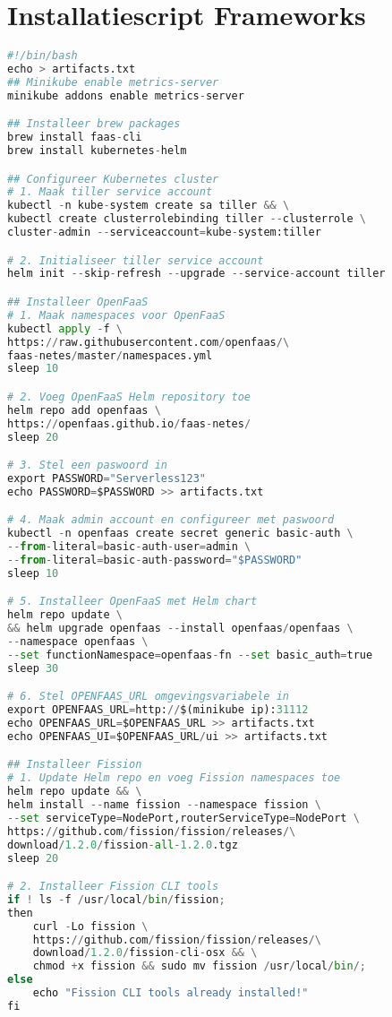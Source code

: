 \section{Installatiescript Frameworks}
\label{sec:installatie-frameworks}
\begin{lstlisting}[language=python]
#!/bin/bash
echo > artifacts.txt
## Minikube enable metrics-server
minikube addons enable metrics-server

## Installeer brew packages
brew install faas-cli
brew install kubernetes-helm

## Configureer Kubernetes cluster
# 1. Maak tiller service account
kubectl -n kube-system create sa tiller && \
kubectl create clusterrolebinding tiller --clusterrole \
cluster-admin --serviceaccount=kube-system:tiller

# 2. Initialiseer tiller service account
helm init --skip-refresh --upgrade --service-account tiller

## Installeer OpenFaaS
# 1. Maak namespaces voor OpenFaaS 
kubectl apply -f \
https://raw.githubusercontent.com/openfaas/\
faas-netes/master/namespaces.yml
sleep 10

# 2. Voeg OpenFaaS Helm repository toe
helm repo add openfaas \
https://openfaas.github.io/faas-netes/
sleep 20

# 3. Stel een paswoord in
export PASSWORD="Serverless123"
echo PASSWORD=$PASSWORD >> artifacts.txt

# 4. Maak admin account en configureer met paswoord
kubectl -n openfaas create secret generic basic-auth \
--from-literal=basic-auth-user=admin \
--from-literal=basic-auth-password="$PASSWORD"
sleep 10

# 5. Installeer OpenFaaS met Helm chart
helm repo update \
&& helm upgrade openfaas --install openfaas/openfaas \
--namespace openfaas \
--set functionNamespace=openfaas-fn --set basic_auth=true
sleep 30

# 6. Stel OPENFAAS_URL omgevingsvariabele in
export OPENFAAS_URL=http://$(minikube ip):31112
echo OPENFAAS_URL=$OPENFAAS_URL >> artifacts.txt
echo OPENFAAS_UI=$OPENFAAS_URL/ui >> artifacts.txt

## Installeer Fission
# 1. Update Helm repo en voeg Fission namespaces toe
helm repo update && \
helm install --name fission --namespace fission \
--set serviceType=NodePort,routerServiceType=NodePort \
https://github.com/fission/fission/releases/\
download/1.2.0/fission-all-1.2.0.tgz
sleep 20

# 2. Installeer Fission CLI tools
if ! ls -f /usr/local/bin/fission;
then
    curl -Lo fission \
    https://github.com/fission/fission/releases/\
    download/1.2.0/fission-cli-osx && \
    chmod +x fission && sudo mv fission /usr/local/bin/;
else
    echo "Fission CLI tools already installed!"
fi


\end{lstlisting}
